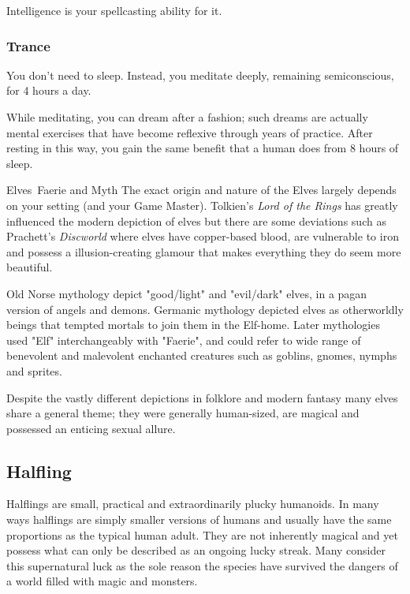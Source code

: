 \documentclass[10pt,twoside]{article}
\begin{document}
\begin{multicols}{2}
Intelligence is your spellcasting ability for it.

\subsubsection*{Trance}
You don’t need to sleep. Instead, you meditate deeply, remaining semiconscious, for 4 hours a day.

While meditating, you can dream after a fashion; such dreams are actually mental exercises that have become reflexive through years of practice. After resting in this way, you gain the same benefit that a human does from 8 hours of sleep.

\begin{commentbox}{Elves\, Faerie and Myth}
The exact origin and nature of the Elves largely depends on your setting (and your Game Master). Tolkien's \textit{Lord of the Rings} has greatly influenced the modern depiction of elves but there are some deviations such as Prachett's \textit{Discworld} where elves have copper-based blood, are vulnerable to iron and possess a illusion-creating glamour that makes everything they do seem more beautiful.

Old Norse mythology depict "good/light" and "evil/dark" elves, in a pagan version of angels and demons. Germanic mythology depicted elves as otherworldly beings that tempted mortals to join them in the Elf-home. Later mythologies used "Elf" interchangeably with "Faerie", and could refer to wide range of benevolent and malevolent enchanted creatures such as goblins, gnomes, nymphs and sprites.

Despite the vastly different depictions in folklore and modern fantasy many elves share a general theme; they were generally human-sized, are magical and possessed an enticing sexual allure.

\end{commentbox}

\end{multicols}

\newpage


\subsection{Halfling}

Halflings are small, practical and extraordinarily plucky humanoids. In many ways halflings are simply smaller versions of humans and usually have the same proportions as the typical human adult. They are not inherently magical and yet possess what can only be described as an ongoing lucky streak. Many consider this supernatural luck as the sole reason the species have survived the dangers of a world filled with magic and monsters.
\end{document}
